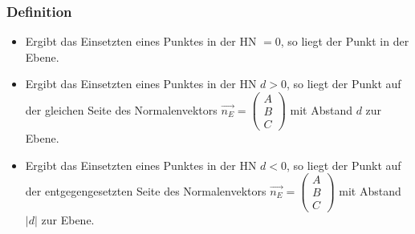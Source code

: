 \subsubsection{Definition}
\begin{itemize}
    \item Ergibt das Einsetzten eines Punktes in der HN \(= 0\), so liegt der Punkt in der Ebene.
    \item Ergibt das Einsetzten eines Punktes in der HN \(d > 0\), so liegt der Punkt auf der gleichen Seite des Normalenvektors \( \vec{n_{E}}= \begin{pmatrix} A \\ B \\ C \end{pmatrix} \) mit Abstand \(d\) zur Ebene. 
    \item Ergibt das Einsetzten eines Punktes in der HN \(d < 0\), so liegt der Punkt auf der entgegengesetzten Seite des Normalenvektors \(\vec{n_{E}} = \begin{pmatrix} A \\ B \\ C \end{pmatrix} \) mit Abstand \(|d|\) zur Ebene.
\end{itemize}
